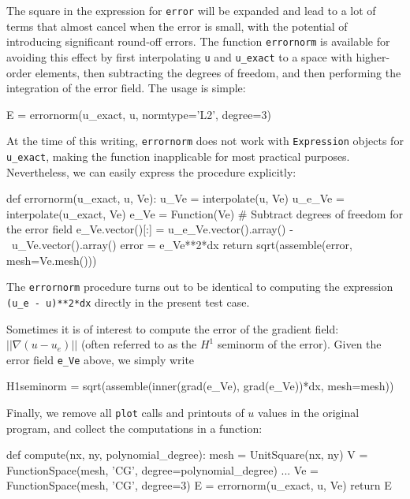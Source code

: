 The square in the expression for {\fontsize{10pt}{10pt}\texttt{error}} will be expanded and lead
to a lot of terms that almost cancel when the error is small, with the
potential of introducing significant round-off errors.
The function {\fontsize{10pt}{10pt}\texttt{errornorm}} is available for avoiding this effect
by first interpolating {\fontsize{10pt}{10pt}\texttt{u}} and {\fontsize{10pt}{10pt}\verb!u_exact!} to a space with
higher-order elements, then subtracting the degrees of freedom, and
then performing the integration of the error field. The usage is simple:
\begin{python}
E = errornorm(u_exact, u, normtype='L2', degree=3)
\end{python}
At the time of this writing, {\fontsize{10pt}{10pt}\texttt{errornorm}} does not work with
{\fontsize{10pt}{10pt}\texttt{Expression}} objects for {\fontsize{10pt}{10pt}\verb!u_exact!}, making the function 
inapplicable for most practical purposes.
Nevertheless, we can easily express the procedure explicitly:
\begin{python}
def errornorm(u_exact, u, Ve):
    u_Ve = interpolate(u, Ve)
    u_e_Ve = interpolate(u_exact, Ve)
    e_Ve = Function(Ve)
    # Subtract degrees of freedom for the error field
    e_Ve.vector()[:] = u_e_Ve.vector().array() - \
                       u_Ve.vector().array()
    error = e_Ve**2*dx
    return sqrt(assemble(error, mesh=Ve.mesh()))
\end{python}
The {\fontsize{10pt}{10pt}\texttt{errornorm}} procedure turns out to be identical to computing
the expression {\fontsize{10pt}{10pt}\verb!(u_e - u)**2*dx!} directly in
the present test case.

Sometimes it is of interest to compute the error of the
gradient field: $||\nabla (u-u_e)||$ 
(often referred to as the $H^1$ seminorm of the error).
Given the error field {\fontsize{10pt}{10pt}\verb!e_Ve!} above, we simply write
\begin{python}
H1seminorm = sqrt(assemble(inner(grad(e_Ve), grad(e_Ve))*dx, 
                           mesh=mesh))
\end{python}

Finally, we remove all {\fontsize{10pt}{10pt}\texttt{plot}} calls and printouts of $u$ values
in the original program, and
collect the computations in a function:
\begin{python}
def compute(nx, ny, polynomial_degree):
    mesh = UnitSquare(nx, ny)
    V = FunctionSpace(mesh, 'CG', degree=polynomial_degree)
    ...
    Ve = FunctionSpace(mesh, 'CG', degree=3)
    E = errornorm(u_exact, u, Ve)
    return E
\end{python}

